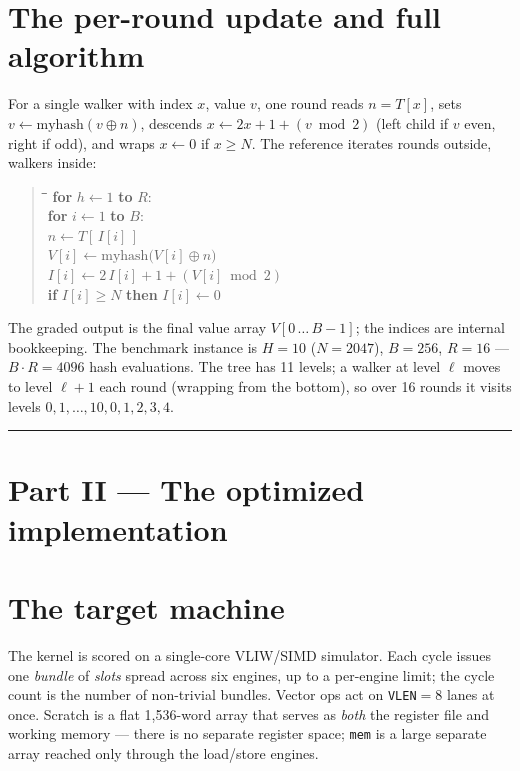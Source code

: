 \documentclass[11pt]{article}
\newcommand{\code}[1]{\texttt{#1}}
\newenvironment{pseudo}
  {\begin{quote}\ttfamily\begin{tabbing}
   \hspace{2em}\=\hspace{2em}\=\hspace{2em}\=\kill}
  {\end{tabbing}\end{quote}}
\begin{document}
\section{The per-round update and full algorithm}

For a single walker with index $x$, value $v$, one round reads $n=T[x]$, sets
$v \leftarrow \mathrm{myhash}(v \oplus n)$, descends
$x \leftarrow 2x + 1 + (v \bmod 2)$ (left child if $v$ even, right if odd),
and wraps $x \leftarrow 0$ if $x \ge N$. The reference iterates rounds outside,
walkers inside:

\begin{pseudo}
\textbf{for} $h \leftarrow 1$ \textbf{to} $R$: \\
\> \textbf{for} $i \leftarrow 1$ \textbf{to} $B$: \\
\> \> $n \leftarrow T[\,I[i]\,]$ \\
\> \> $V[i] \leftarrow \mathrm{myhash}\bigl(V[i] \oplus n\bigr)$ \\
\> \> $I[i] \leftarrow 2\,I[i] + 1 + (V[i] \bmod 2)$ \\
\> \> \textbf{if } $I[i] \ge N$ \textbf{ then } $I[i] \leftarrow 0$ \\
\end{pseudo}

\noindent The graded output is the final value array $V[0\,\dots\,B-1]$; the
indices are internal bookkeeping. The benchmark instance is $H=10$
($N=2047$), $B=256$, $R=16$ --- $B\cdot R = 4096$ hash evaluations. The tree
has 11 levels; a walker at level $\ell$ moves to level $\ell+1$ each round
(wrapping from the bottom), so over 16 rounds it visits levels
$0,1,\dots,10,0,1,2,3,4$.

\begin{center}\rule{0.4\linewidth}{0.4pt}\end{center}
\section*{\centering Part II --- The optimized implementation}

\section{The target machine}

The kernel is scored on a single-core VLIW/SIMD simulator. Each cycle issues
one \emph{bundle} of \emph{slots} spread across six engines, up to a
per-engine limit; the cycle count is the number of non-trivial bundles.
Vector ops act on \code{VLEN}${}=8$ lanes at once. Scratch is a flat
1{,}536-word array that serves as \emph{both} the register file and working
memory --- there is no separate register space; \code{mem} is a large
separate array reached only through the load/store engines.
\end{document}
